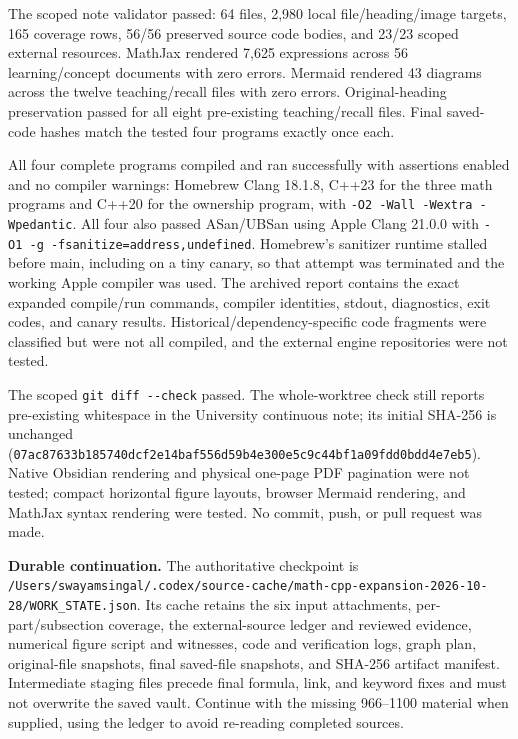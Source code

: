 The scoped note validator passed: 64 files, 2,980 local file/heading/image targets, 165 coverage rows, 56/56 preserved source code bodies, and 23/23 scoped external resources. MathJax rendered 7,625 expressions across 56 learning/concept documents with zero errors. Mermaid rendered 43 diagrams across the twelve teaching/recall files with zero errors. Original-heading preservation passed for all eight pre-existing teaching/recall files. Final saved-code hashes match the tested four programs exactly once each.

All four complete programs compiled and ran successfully with assertions enabled and no compiler warnings: Homebrew Clang 18.1.8, C++23 for the three math programs and C++20 for the ownership program, with \texttt{-O2\ -Wall\ -Wextra\ -Wpedantic}. All four also passed ASan/UBSan using Apple Clang 21.0.0 with \texttt{-O1\ -g\ -fsanitize=address,undefined}. Homebrew's sanitizer runtime stalled before main, including on a tiny canary, so that attempt was terminated and the working Apple compiler was used. The archived report contains the exact expanded compile/run commands, compiler identities, stdout, diagnostics, exit codes, and canary results. Historical/dependency-specific code fragments were classified but were not all compiled, and the external engine repositories were not tested.

The scoped \texttt{git\ diff\ -\/-check} passed. The whole-worktree check still reports pre-existing whitespace in the University continuous note; its initial SHA-256 is unchanged (\texttt{07ac87633b185740dcf2e14baf556d59b4e300e5c9c44bf1a09fdd0bdd4e7eb5}). Native Obsidian rendering and physical one-page PDF pagination were not tested; compact horizontal figure layouts, browser Mermaid rendering, and MathJax syntax rendering were tested. No commit, push, or pull request was made.

\textbf{Durable continuation.} The authoritative checkpoint is \texttt{/Users/swayamsingal/.codex/source-cache/math-cpp-expansion-2026-10-28/WORK\_STATE.json}. Its cache retains the six input attachments, per-part/subsection coverage, the external-source ledger and reviewed evidence, numerical figure script and witnesses, code and verification logs, graph plan, original-file snapshots, final saved-file snapshots, and SHA-256 artifact manifest. Intermediate staging files precede final formula, link, and keyword fixes and must not overwrite the saved vault. Continue with the missing 966--1100 material when supplied, using the ledger to avoid re-reading completed sources.

